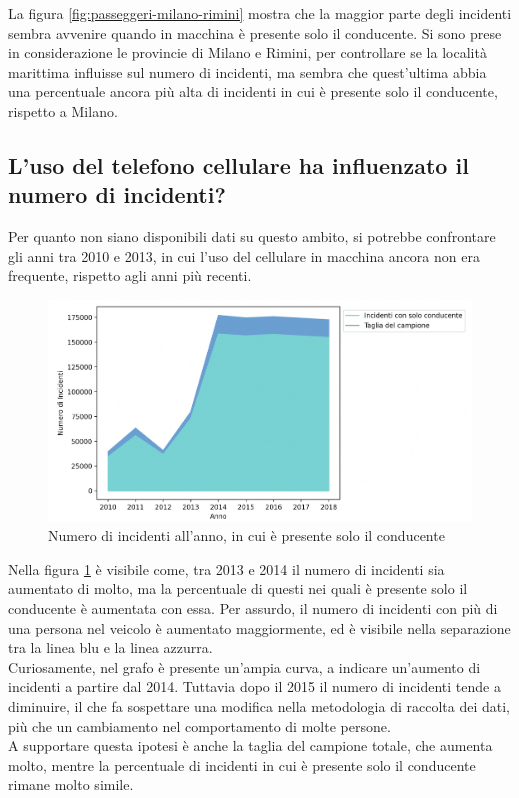 \documentclass[a4paper]{report}
\begin{document}
La figura \ref{fig:passeggeri-milano-rimini} mostra che la maggior parte degli incidenti 
sembra avvenire quando in macchina è presente solo il conducente.
Si sono prese in considerazione le provincie di Milano e Rimini, per controllare se la località 
marittima influisse sul numero di incidenti, ma sembra che quest'ultima abbia una percentuale 
ancora più alta di incidenti in cui è presente solo il conducente, rispetto a Milano.

\subsection{L'uso del telefono cellulare ha influenzato il numero di incidenti?}

Per quanto non siano disponibili dati su questo ambito, si potrebbe confrontare gli anni tra 2010 e 2013, 
in cui l'uso del cellulare in macchina ancora non era frequente, rispetto agli anni più recenti.

\begin{figure}
    \includegraphics[width=\linewidth]{../src/incidenti/incidenti_senza_coords/anno/incremento_incidenti.png}
    \caption{Numero di incidenti all'anno, in cui è presente solo il conducente}
    \label{fig:incremento-incidenti}
\end{figure}

Nella figura \ref{fig:incremento-incidenti} è visibile come, 
tra 2013 e 2014 il numero di incidenti sia aumentato di molto, 
ma la percentuale di questi nei quali è presente solo il conducente è aumentata con essa.
Per assurdo, il numero di incidenti con più di una persona nel veicolo è aumentato maggiormente, 
ed è visibile nella separazione tra la linea blu e la linea azzurra.\\

Curiosamente, nel grafo è presente un'ampia curva, a indicare un'aumento di incidenti 
a partire dal 2014. Tuttavia dopo il 2015 il numero di incidenti tende a diminuire, il che 
fa sospettare una modifica nella metodologia di raccolta dei dati, più che un cambiamento 
nel comportamento di molte persone.\\
A supportare questa ipotesi è anche la taglia del campione totale, che aumenta molto, mentre la 
percentuale di incidenti in cui è presente solo il conducente rimane molto simile.
\end{document}
